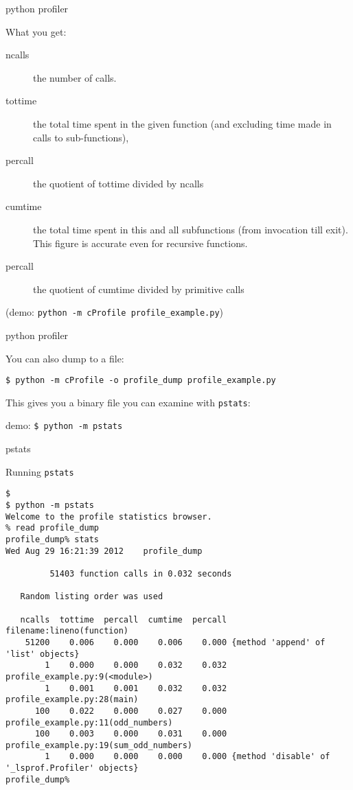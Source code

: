 \documentclass{beamer}
\begin{document}
\begin{frame}[fragile]{python profiler}

{\Large What you get:}

\begin{description}
  \item[ncalls] the number of calls.
  \item[tottime] the total time spent in the given function (and excluding time made in calls to sub-functions),
  \item[percall] the quotient of tottime divided by ncalls
  \item[cumtime] the total time spent in this and all subfunctions (from invocation till exit). This figure is accurate even for recursive functions.
  \item[percall] the quotient of cumtime divided by primitive calls
\end{description}
(demo: \verb|python -m cProfile profile_example.py|)
\end{frame} 

\begin{frame}[fragile]{python profiler}

{\Large You can also dump to a file:}

\vfill
{\verb|$ python -m cProfile -o profile_dump profile_example.py|}

\vfill
{\large This gives you a binary file you can examine with \verb|pstats|:}

\vfill
{demo: \verb|$ python -m pstats|}

\end{frame} 

\begin{frame}[fragile]{pstats}

{\Large Running \verb|pstats|}
{\small
\begin{verbatim}
$
$ python -m pstats
Welcome to the profile statistics browser.
% read profile_dump
profile_dump% stats
Wed Aug 29 16:21:39 2012    profile_dump

         51403 function calls in 0.032 seconds

   Random listing order was used

   ncalls  tottime  percall  cumtime  percall filename:lineno(function)
    51200    0.006    0.000    0.006    0.000 {method 'append' of 'list' objects}
        1    0.000    0.000    0.032    0.032 profile_example.py:9(<module>)
        1    0.001    0.001    0.032    0.032 profile_example.py:28(main)
      100    0.022    0.000    0.027    0.000 profile_example.py:11(odd_numbers)
      100    0.003    0.000    0.031    0.000 profile_example.py:19(sum_odd_numbers)
        1    0.000    0.000    0.000    0.000 {method 'disable' of '_lsprof.Profiler' objects}
profile_dump% 
\end{verbatim}
}
\end{frame} 
\end{document}
